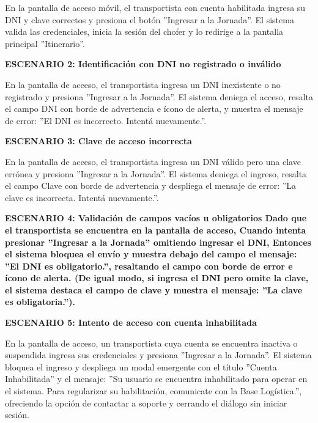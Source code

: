 \documentclass[a4paper,9pt]{article}
\begin{document}
\begin{tcolorbox}[hucard, title={\textbf{HU-23: INICIAR SESIÓN} \hfill \scriptsize \colorbox{tealstatus}{\textbf{\ Accepted\ }} \quad \colorbox{white}{\textcolor{primarydark}{\textbf{\ 2 pts\ }}}}]
{En la pantalla de acceso móvil, el transportista con cuenta habilitada ingresa su DNI y clave correctos y presiona el botón ''Ingresar a la Jornada''. El sistema valida las credenciales, inicia la sesión del chofer y lo redirige a la pantalla principal ''Itinerario''.\par\vspace{2.5pt}
\noindent\textbf{\textcolor{secondarydark}{ESCENARIO 2:  Identificación con DNI no registrado o inválido}}\par\vspace{1pt}
En la pantalla de acceso, el transportista ingresa un DNI inexistente o no registrado y presiona ''Ingresar a la Jornada''. El sistema deniega el acceso, resalta el campo DNI con borde de advertencia e ícono de alerta, y muestra el mensaje de error: ''El DNI es incorrecto. Intentá nuevamente.''.\par\vspace{2.5pt}
\noindent\textbf{\textcolor{secondarydark}{ESCENARIO 3:  Clave de acceso incorrecta}}\par\vspace{1pt}
En la pantalla de acceso, el transportista ingresa un DNI válido pero una clave errónea y presiona ''Ingresar a la Jornada''. El sistema deniega el ingreso, resalta el campo Clave con borde de advertencia y despliega el mensaje de error: ''La clave es incorrecta. Intentá nuevamente.''.\par\vspace{2.5pt}
\noindent\textbf{\textcolor{secondarydark}{ESCENARIO 4:  Validación de campos vacíos u obligatorios Dado que el transportista se encuentra en la pantalla de acceso, Cuando intenta presionar ''Ingresar a la Jornada'' omitiendo ingresar el DNI, Entonces el sistema bloquea el envío y muestra debajo del campo el mensaje: ''El DNI es obligatorio.'', resaltando el campo con borde de error e ícono de alerta. (De igual modo, si ingresa el DNI pero omite la clave, el sistema destaca el campo de clave y muestra el mensaje: ''La clave es obligatoria.'').}}\par\vspace{1pt}
\noindent\textbf{\textcolor{secondarydark}{ESCENARIO 5:  Intento de acceso con cuenta inhabilitada}}\par\vspace{1pt}
En la pantalla de acceso, un transportista cuya cuenta se encuentra inactiva o suspendida ingresa sus credenciales y presiona ''Ingresar a la Jornada''. El sistema bloquea el ingreso y despliega un modal emergente con el título ''Cuenta Inhabilitada'' y el mensaje: ''Su usuario se encuentra inhabilitado para operar en el sistema. Para regularizar su habilitación, comunicate con la Base Logística.'', ofreciendo la opción de contactar a soporte y cerrando el diálogo sin iniciar sesión.\par\vspace{2.5pt}
}\par
\end{tcolorbox}
\end{document}
